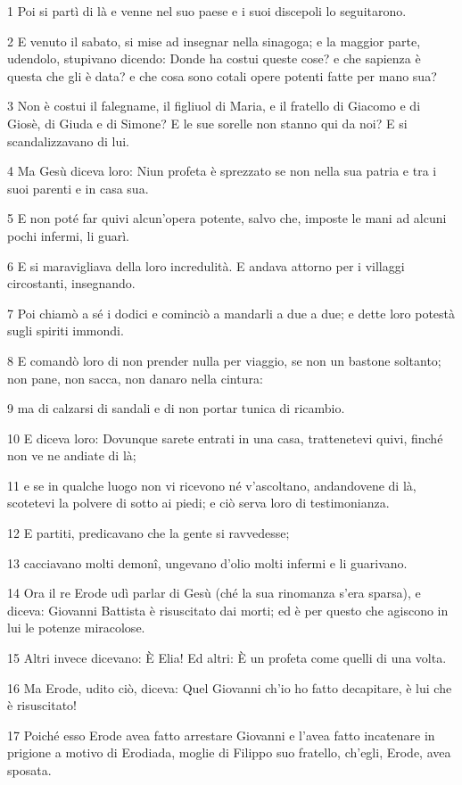 \par 1 Poi si partì di là e venne nel suo paese e i suoi discepoli lo seguitarono.
\par 2 E venuto il sabato, si mise ad insegnar nella sinagoga; e la maggior parte, udendolo, stupivano dicendo: Donde ha costui queste cose? e che sapienza è questa che gli è data? e che cosa sono cotali opere potenti fatte per mano sua?
\par 3 Non è costui il falegname, il figliuol di Maria, e il fratello di Giacomo e di Giosè, di Giuda e di Simone? E le sue sorelle non stanno qui da noi? E si scandalizzavano di lui.
\par 4 Ma Gesù diceva loro: Niun profeta è sprezzato se non nella sua patria e tra i suoi parenti e in casa sua.
\par 5 E non poté far quivi alcun'opera potente, salvo che, imposte le mani ad alcuni pochi infermi, li guarì.
\par 6 E si maravigliava della loro incredulità. E andava attorno per i villaggi circostanti, insegnando.
\par 7 Poi chiamò a sé i dodici e cominciò a mandarli a due a due; e dette loro potestà sugli spiriti immondi.
\par 8 E comandò loro di non prender nulla per viaggio, se non un bastone soltanto; non pane, non sacca, non danaro nella cintura:
\par 9 ma di calzarsi di sandali e di non portar tunica di ricambio.
\par 10 E diceva loro: Dovunque sarete entrati in una casa, trattenetevi quivi, finché non ve ne andiate di là;
\par 11 e se in qualche luogo non vi ricevono né v'ascoltano, andandovene di là, scotetevi la polvere di sotto ai piedi; e ciò serva loro di testimonianza.
\par 12 E partiti, predicavano che la gente si ravvedesse;
\par 13 cacciavano molti demonî, ungevano d'olio molti infermi e li guarivano.
\par 14 Ora il re Erode udì parlar di Gesù (ché la sua rinomanza s'era sparsa), e diceva: Giovanni Battista è risuscitato dai morti; ed è per questo che agiscono in lui le potenze miracolose.
\par 15 Altri invece dicevano: È Elia! Ed altri: È un profeta come quelli di una volta.
\par 16 Ma Erode, udito ciò, diceva: Quel Giovanni ch'io ho fatto decapitare, è lui che è risuscitato!
\par 17 Poiché esso Erode avea fatto arrestare Giovanni e l'avea fatto incatenare in prigione a motivo di Erodiada, moglie di Filippo suo fratello, ch'egli, Erode, avea sposata.
